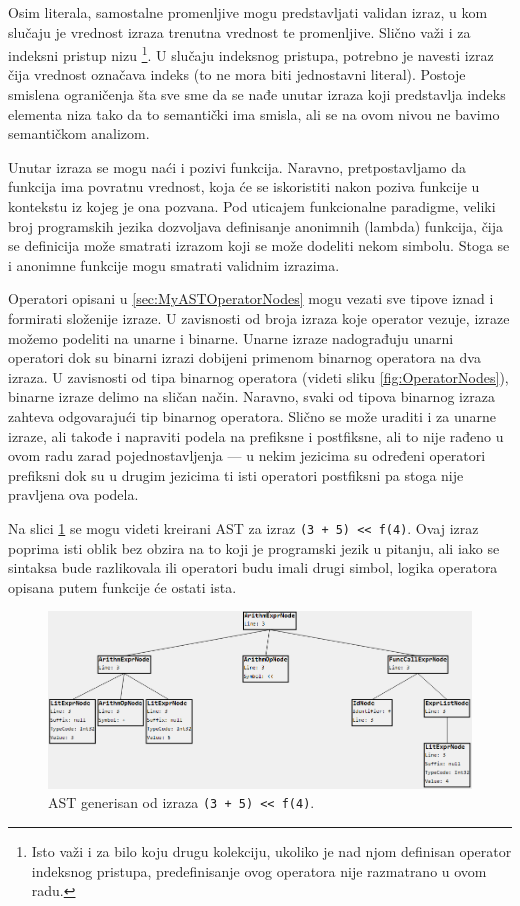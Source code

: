 Osim literala, samostalne promenljive mogu predstavljati validan izraz, u kom slučaju je vrednost izraza trenutna vrednost te promenljive. Slično važi i za indeksni pristup nizu \footnote{Isto važi i za bilo koju drugu kolekciju, ukoliko je nad njom definisan operator indeksnog pristupa, predefinisanje ovog operatora nije razmatrano u ovom radu.}. U slučaju indeksnog pristupa, potrebno je navesti izraz čija vrednost označava indeks (to ne mora biti jednostavni literal). Postoje smislena ograničenja šta sve sme da se nađe unutar izraza koji predstavlja indeks elementa niza tako da to semantički ima smisla, ali se na ovom nivou ne bavimo semantičkom analizom. 

Unutar izraza se mogu naći i pozivi funkcija. Naravno, pretpostavljamo da funkcija ima povratnu vrednost, koja će se iskoristiti nakon poziva funkcije u kontekstu iz kojeg je ona pozvana. Pod uticajem funkcionalne paradigme, veliki broj programskih jezika dozvoljava definisanje anonimnih (lambda) funkcija, čija se definicija može smatrati izrazom koji se može dodeliti nekom simbolu. Stoga se i anonimne funkcije mogu smatrati validnim izrazima. 

Operatori opisani u \ref{sec:MyASTOperatorNodes} mogu vezati sve tipove iznad i formirati složenije izraze. U zavisnosti od broja izraza koje operator vezuje, izraze možemo podeliti na unarne i binarne. Unarne izraze nadograđuju unarni operatori dok su binarni izrazi dobijeni primenom binarnog operatora na dva izraza. U zavisnosti od tipa binarnog operatora (videti sliku \ref{fig:OperatorNodes}), binarne izraze delimo na sličan način. Naravno, svaki od tipova binarnog izraza zahteva odgovarajući tip binarnog operatora. Slično se može uraditi i za unarne izraze, ali takođe i napraviti podela na prefiksne i postfiksne, ali to nije rađeno u ovom radu zarad pojednostavljenja --- u nekim jezicima su određeni operatori prefiksni dok su u drugim jezicima ti isti operatori postfiksni pa stoga nije pravljena ova podela.

Na slici \ref{fig:MyASTExampleExpressions} se mogu videti kreirani AST za izraz \texttt{(3 + 5) << f(4)}. Ovaj izraz poprima isti oblik bez obzira na to koji je programski jezik u pitanju, ali iako se sintaksa bude razlikovala ili operatori budu imali drugi simbol, logika operatora opisana putem funkcije će ostati ista.

\begin{figure}[h!]
\centering
\includegraphics[scale=0.6]{images/ast_expr.png}
\caption{AST generisan od izraza \texttt{(3 + 5) << f(4)}.}
\label{fig:MyASTExampleExpressions}
\end{figure}

